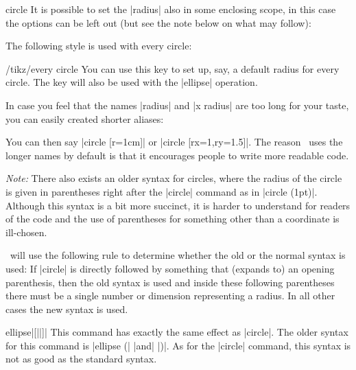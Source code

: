 \begin{pathoperation}{circle}{}
  It is possible to set the |radius| also in some enclosing scope, in
  this case the options can be left out (but see the note below on
  what may follow):
\begin{codeexample}[]
\end{codeexample}

  The following style is used with every circle:
  \begin{stylekey}{/tikz/every circle}
    You can use this key to set up, say, a default radius for every
    circle. The key will also be used with the |ellipse| operation.
  \end{stylekey}

  In case you feel that the names |radius| and |x radius| are too long
  for your taste, you can easily created shorter aliases:
\begin{codeexample}
\end{codeexample}
  You can then say |circle [r=1cm]| or |circle [rx=1,ry=1.5]|. The
  reason \tikzname\ uses the longer names by default is that it
  encourages people to write more readable code.

  \emph{Note:} There also exists an older syntax for circles, where
  the radius of the circle is given in parentheses right after the
  |circle| command as in |circle (1pt)|. Although this syntax is a bit
  more succinct, it is harder to understand for readers of the code
  and the use of parentheses for something other than a coordinate is
  ill-chosen.

  \tikzname\ will use the following rule to determine whether the old
  or the normal syntax is used: If |circle| is directly followed by
  something that (expands to) an opening parenthesis, then the old
  syntax is used and inside these following parentheses there must be
  a single number or dimension representing a radius. In all other
  cases the new syntax is used.
\end{pathoperation}

\begin{pathoperation}{ellipse}{|[||]|}
  This command has exactly the same effect as |circle|. The older
  syntax for this command is |ellipse (| |and| |)|. As for the |circle| command, this syntax is not as
  good as the standard syntax.
\begin{codeexample}[]
\end{codeexample}
\end{pathoperation}



